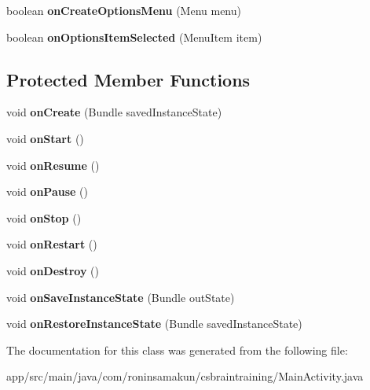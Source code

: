 \begin{DoxyCompactItemize}
\item 
boolean {\bfseries on\+Create\+Options\+Menu} (Menu menu)\label{classcom_1_1roninsamakun_1_1csbraintraining_1_1_main_activity_a82e0c902ca1055015be4a050d78d01ba}

\item 
boolean {\bfseries on\+Options\+Item\+Selected} (Menu\+Item item)\label{classcom_1_1roninsamakun_1_1csbraintraining_1_1_main_activity_ad451948982173cdf27c298ac4310da58}

\end{DoxyCompactItemize}
\subsection*{Protected Member Functions}
\begin{DoxyCompactItemize}
\item 
void {\bfseries on\+Create} (Bundle saved\+Instance\+State)\label{classcom_1_1roninsamakun_1_1csbraintraining_1_1_main_activity_ac6b4b31a8e68c2198be219976a3199c1}

\item 
void {\bfseries on\+Start} ()\label{classcom_1_1roninsamakun_1_1csbraintraining_1_1_main_activity_a616386e6879100384b3af2b903964ea0}

\item 
void {\bfseries on\+Resume} ()\label{classcom_1_1roninsamakun_1_1csbraintraining_1_1_main_activity_a96f146091f6f7552c27fb95e37273ca0}

\item 
void {\bfseries on\+Pause} ()\label{classcom_1_1roninsamakun_1_1csbraintraining_1_1_main_activity_aae2a3cff0718bda8b953fab0ab0bdb24}

\item 
void {\bfseries on\+Stop} ()\label{classcom_1_1roninsamakun_1_1csbraintraining_1_1_main_activity_ac28a0fbf11c86eb2fecad0e9788c9571}

\item 
void {\bfseries on\+Restart} ()\label{classcom_1_1roninsamakun_1_1csbraintraining_1_1_main_activity_a315549e935806a2a5933219178ca7649}

\item 
void {\bfseries on\+Destroy} ()\label{classcom_1_1roninsamakun_1_1csbraintraining_1_1_main_activity_a72ad95c3fb79d5c2984403b56fc1e921}

\item 
void {\bfseries on\+Save\+Instance\+State} (Bundle out\+State)\label{classcom_1_1roninsamakun_1_1csbraintraining_1_1_main_activity_af367b239434ef2b88e10f1ec191e738f}

\item 
void {\bfseries on\+Restore\+Instance\+State} (Bundle saved\+Instance\+State)\label{classcom_1_1roninsamakun_1_1csbraintraining_1_1_main_activity_a665d9b5f8c60056cc4276d21d07eba08}

\end{DoxyCompactItemize}


The documentation for this class was generated from the following file\+:\begin{DoxyCompactItemize}
\item 
app/src/main/java/com/roninsamakun/csbraintraining/Main\+Activity.\+java\end{DoxyCompactItemize}
